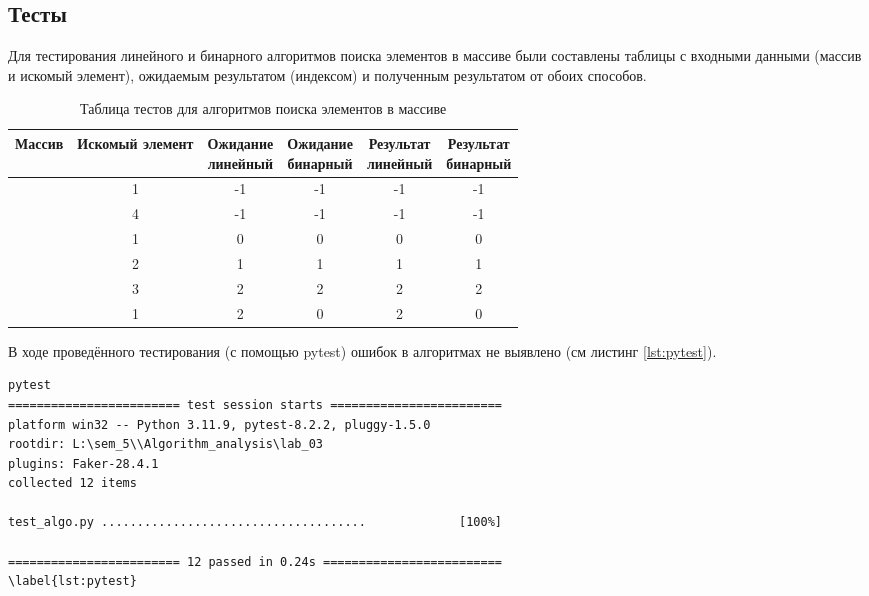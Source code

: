 \vspace{0.25cm}
\subsection{Тесты}

\hspace{1.25cm}
Для тестирования линейного и бинарного алгоритмов поиска элементов в массиве были составлены таблицы с входными данными (массив и искомый элемент), ожидаемым результатом (индексом) и полученным результатом от обоих способов.

\vspace{0.25cm}
\begin{table}[H]
    \centering
    \caption{Таблица тестов для алгоритмов поиска элементов в массиве}
    \renewcommand{\arraystretch}{1.5} %
    \begin{tabular}{|c|c|c|c|c|c|}
        \hline
        \textbf{Массив} & \textbf{Искомый элемент} & \makecell{\textbf{Ожидание}\\линейный} & \makecell{\textbf{Ожидание}\\бинарный} & \makecell{\textbf{Результат}\\линейный} & \makecell{\textbf{Результат}\\бинарный}\\
        \hline
        [] & 1 & -1 & -1 & -1 & -1 \\
        \hline
        [1, 2, 3] & 4 & -1 & -1 & -1 & -1 \\
        \hline
        [1, 2, 3] & 1 & 0 & 0 & 0 & 0 \\
        \hline
        [1, 2, 3] & 2 & 1 & 1 & 1 & 1 \\
        \hline
        [1, 2, 3] & 3 & 2 & 2 & 2 & 2 \\
        \hline
        [3, 2, 1] & 1 & 2 & 0 & 2 & 0 \\
        \hline
    \end{tabular}
\end{table}

В ходе проведённого тестирования (с помощью pytest) ошибок в алгоритмах не выявлено (см листинг \ref{lst:pytest}).

\vspace{0.25cm}
\begin{lstlisting}[caption=тестирование алгоритмов с помощью pytest]
pytest
======================== test session starts ========================
platform win32 -- Python 3.11.9, pytest-8.2.2, pluggy-1.5.0
rootdir: L:\sem_5\\Algorithm_analysis\lab_03
plugins: Faker-28.4.1
collected 12 items                                                                                                                                                                

test_algo.py .....................................             [100%]

======================== 12 passed in 0.24s =========================
\label{lst:pytest}
\end{lstlisting}

\newpage